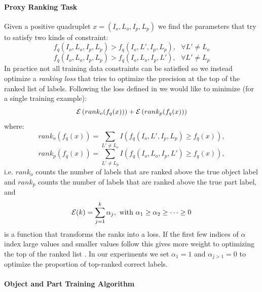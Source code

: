 \paragraph{Proxy Ranking Task}

Given a positive quadruplet  $x = (I_o,L_o,I_p,L_p)$ we find the parameters that try to satisfy two kinds of 
constraint:
\begin{equation} \label{con1}  
   f_q(I_o,L_o,I_p,L_p) > f_q(I_o,L',I_p,L_p), ~~~ \forall L' \neq L_o
\end{equation} 
\begin{equation} \label{con2}  
   f_q(I_o,L_o,I_p,L_p) > f_q(I_o,L_o,I_p,L'), ~~~ \forall L' \neq L_p
\end{equation} 
In practice not all training data constraints can be satisfied so we instead optimize a {\em ranking loss}
that tries to optimize the precision at the top of the ranked list of labels.
Following the loss defined in \citep{usunier,wsabie} 
we would like to minimize (for a single training example):
\[
   {\cal E} \left(rank_o(f_q(x))\right)  +    {\cal E} \left(rank_p(f_q(x))\right) 
\]
where:
\[
  rank_o(f_q(x)) =  \sum_{L' \neq L_o}  I( f_q(I_o,L',I_p,L_p) \geq f_q(x)),
\]
\[
  rank_p(f_q(x)) =  \sum_{L' \neq L_p}  I( f_q(I_o,L_o,I_p,L') \geq f_q(x)),
\]
i.e. $rank_o$ counts the number of labels that are ranked above the true object label 
and $rank_p$ counts the number of labels that are ranked above the true part label, and
\[
 {\cal E}(k)  =  \sum_{j=1}^k \alpha_j, \text{~with~} \alpha_1 \geq
 \alpha_2\geq \dots \geq 0
\]
is a function that transforms the ranks into a loss. 
If the first few indices of $\alpha$ index large values and smaller values follow this 
gives more weight to optimizing the top of the ranked list \citep{usunier}.
In our experiments we set  $\alpha_1=1$ and 
$\alpha_{j>1}=0$ to optimize the proportion of top-ranked correct labels.


\paragraph{Object and Part Training Algorithm}

